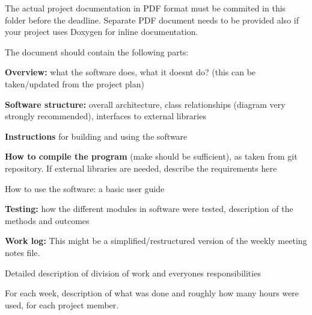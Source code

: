 The actual project documentation in PDF format must be commited in this folder before the deadline. Separate PDF document needs to be provided also if your project uses Doxygen for inline documentation.

The document should contain the following parts\+:


\begin{DoxyEnumerate}
\item {\bfseries{Overview\+:}} what the software does, what it doesn\textquotesingle{}t do? (this can be taken/updated from the project plan)
\item {\bfseries{Software structure\+:}} overall architecture, class relationships (diagram very strongly recommended), interfaces to external libraries
\item {\bfseries{Instructions}} for building and using the software
\item {\bfseries{How to compile the program}} (\textquotesingle{}make\textquotesingle{} should be sufficient), as taken from git repository. If external libraries are needed, describe the requirements here
\item How to use the software\+: a basic user guide
\item {\bfseries{Testing\+:}} how the different modules in software were tested, description of the methods and outcomes
\item {\bfseries{Work log\+:}} This might be a simplified/restructured version of the weekly meeting notes file.
\item Detailed description of division of work and everyone\textquotesingle{}s responsibilities
\item For each week, description of what was done and roughly how many hours were used, for each project member. 
\end{DoxyEnumerate}